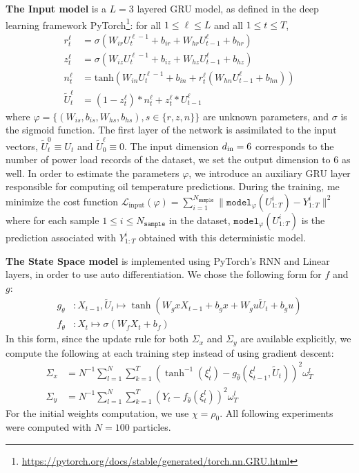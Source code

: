 \documentclass[journal]{IEEEtran}
\begin{document}
\textbf{The Input model} is a $L=3$ layered GRU model, as defined in the deep learning framework PyTorch\footnote{\href{https://pytorch.org/docs/stable/generated/torch.nn.GRU.html}{https://pytorch.org/docs/stable/generated/torch.nn.GRU.html}}: for all $1 \leq \ell \leq L$ and all $1 \leq t \leq T$,
\begin{align*}
	r^\ell_t        & = \sigma(W_{ir} U^{\ell - 1}_t + b_{ir} + W_{hr} U^{\ell}_{t-1} + b_{hr})                 \\
	z^\ell_t        & = \sigma(W_{iz} U^{\ell - 1}_t + b_{iz} + W_{hz} U^{\ell}_{t-1} + b_{hz})                 \\
	n^\ell_t        & = \mathrm{tanh}(W_{in} U^{\ell - 1}_t + b_{in} + r^\ell_t (W_{hn} U^\ell_{t-1} + b_{hn})) \\
	\tilde U^\ell_t & = (1-z^\ell_t) * n^\ell_t+z^\ell_t * U^\ell_{t-1}
\end{align*}
where $\varphi = \{(W_{is}, b_{is}, W_{hs}, b_{hs}), s \in \{r, z, n\}\}$ are unknown parameters, and $\sigma$ is the sigmoid function.
The first layer of the network is assimilated to the input vectors, $\widetilde U_t^0 \equiv U_t$ and $\widetilde U^\ell_0 \equiv 0$.
The input dimension $d_\textnormal{in}=6$ corresponds to the number of power load records of the dataset, we set the output dimension to 6 as well.
In order to estimate the parameters $\varphi$, we introduce an auxiliary GRU layer responsible for computing oil temperature predictions.
During the training, me minimize the cost function $\mathcal{L}_{\mathrm{input}}(\varphi) = \sum_{i=1}^{N_{\texttt{sample}}} \|\texttt{model}_{\varphi}(U^i_{1:T}) - Y^i_{1:T}\|^2$ where for each sample $1 \leq i \leq N_{\texttt{sample}}$ in the dataset, $\texttt{model}_\varphi(U^i_{1:T})$ is the prediction associated with $Y^i_{1:T}$ obtained with this deterministic model.

\textbf{The State Space model} is implemented using PyTorch's RNN and Linear layers, in order to use auto differentiation.
We chose the following form for $f$ and $g$:
\begin{align*}
	g_\theta &: X_{t-1}, \widetilde U_t \mapsto \tanh(W_gx X_{t-1} + b_gx + W_gu \widetilde U_t + b_gu) \\
	f_\theta &: X_t \mapsto  \sigma(W_f X_t + b_f)
\end{align*}
In this form, since the update rule for both $\Sigma_x$ and $\Sigma_y$ are available explicitly, we compute the following at each training step instead of using gradient descent:
\begin{align*}
	\Sigma_x &= N^{-1} \sum_{l=1}^N \sum_{k=1}^T (\tanh^{-1}(\xi_t^l) - g_{\hat \theta}(\xi^l_{t-1}, \widetilde U_t))^2 \omega_T^l \\
	\Sigma_y &= N^{-1} \sum_{l=1}^N \sum_{k=1}^T (Y_t - f_{\hat \theta}(\xi^l_t))^2 \omega_T^l
\end{align*}
For the initial weights computation, we use $\chi = \rho_0$.
All following experiments were computed with $N=100$ particles.
\end{document}
